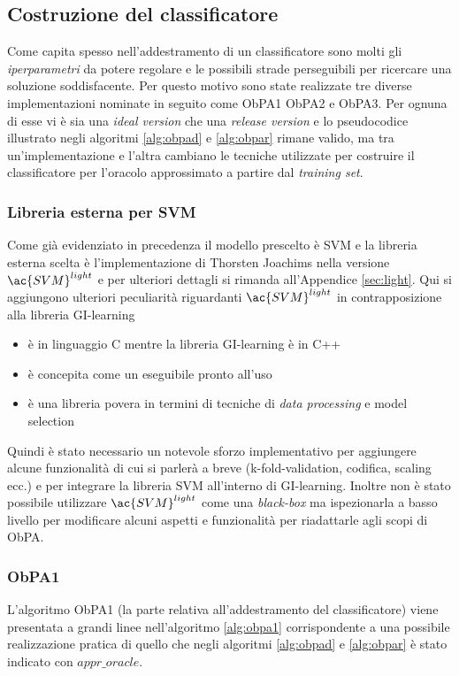 \subsection{Costruzione del classificatore}
Come capita spesso nell'addestramento di un classificatore  sono molti gli \textit{iperparametri} da potere regolare e le possibili strade perseguibili per ricercare una soluzione soddisfacente. Per questo motivo sono state realizzate tre diverse implementazioni nominate in seguito come \ac{ObPA}1 \ac{ObPA}2 e \ac{ObPA}3. Per ognuna di esse vi è sia una \textit{ideal version} che una \textit{release version} e lo pseudocodice illustrato negli algoritmi \ref{alg:obpad} e \ref{alg:obpar} rimane valido, ma tra un'implementazione e l'altra cambiano le tecniche utilizzate per costruire il classificatore per l'oracolo approssimato a partire dal \textit{training set}.

\subsubsection{Libreria esterna per SVM}
Come già evidenziato in precedenza il modello prescelto è \ac{SVM} e la libreria esterna scelta è l'implementazione di Thorsten Joachims nella versione $\ac{SVM}^{light}$ e per ulteriori dettagli si rimanda all'Appendice \ref{sec:light}. Qui si aggiungono ulteriori peculiarità riguardanti $\ac{SVM}^{light}$ in contrapposizione alla libreria GI-learning
\begin{itemize}
\item è in linguaggio C mentre la libreria GI-learning è in C++
\item è concepita come un eseguibile pronto all'uso
\item è una libreria povera  in termini di tecniche di \textit{data processing} e model selection

\end{itemize}
 Quindi è stato necessario un notevole sforzo implementativo per aggiungere alcune funzionalità di cui si parlerà a breve (k-fold-validation, codifica, scaling ecc.) e per integrare la libreria \ac{SVM} all'interno di GI-learning. Inoltre non è stato possibile utilizzare  $\ac{SVM}^{light}$ come una \textit{black-box} ma ispezionarla a basso livello per modificare alcuni aspetti e funzionalità per riadattarle agli scopi di \ac{ObPA}.\\

\subsubsection{ObPA1}
L'algoritmo \ac{ObPA}1 (la parte relativa all'addestramento del classificatore) viene presentata a grandi linee nell'algoritmo \ref{alg:obpa1} corrispondente a una possibile realizzazione pratica di quello che negli algoritmi \ref{alg:obpad} e \ref{alg:obpar}  è stato indicato con $appr\_oracle$.

